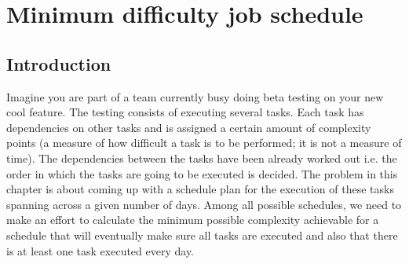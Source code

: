 %

\chapter{Minimum difficulty job schedule}
\label{ch:min_difficulty_job_scheduler}
\section*{Introduction}
Imagine you are part of a team currently busy doing beta testing on your new cool feature. The
testing consists of executing several tasks. Each task has dependencies on other tasks and is
assigned a certain amount of complexity points (a measure of how difficult a task is to be
performed; it is not a measure of time). The dependencies between the tasks have been already worked
out i.e. the order in which the tasks are going to be executed is decided. The problem in this
chapter is about coming up with a schedule plan for the execution of these tasks spanning across a
given number of days. Among all possible schedules, we need to make an effort to calculate the
minimum possible complexity achievable for a schedule that will eventually make sure all tasks are
executed and also that there is at least one task executed every day.


